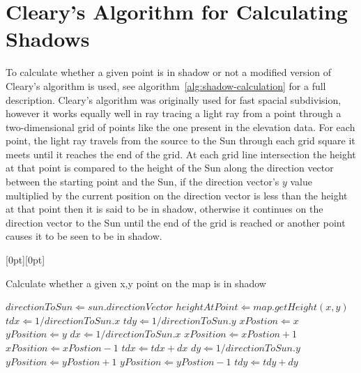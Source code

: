 \documentclass[12pt]{report}
\newcommand{\note}[1]{\raisebox{0pt}[0pt][0pt]{\pdfcomment[open=true]{#1}}}
\begin{document}
\section{Cleary's Algorithm for Calculating Shadows}
To calculate whether a given point is in shadow or not a modified version of Cleary's algorithm\cite{cleary} is used, see algorithm~\ref{alg:shadow-calculation} for a full description. Cleary's algorithm was originally used for fast spacial subdivision, however it works equally well in ray tracing a light ray from a point through a two-dimensional grid of points like the one present in the elevation data. For each point, the light ray travels from the source to the Sun through each grid square it meets until it reaches the end of the grid. At each grid line intersection the height at that point is compared to the height of the Sun along the direction vector between the starting point and the Sun, if the direction vector's $y$ value multiplied by the current position on the direction vector is less than the height at that point then it is said to be in shadow, otherwise it continues on the direction vector to the Sun until the end of the grid is reached or another point causes it to be seen to be in shadow.

\begin{algorithm}[h]
\note{I have no idea how to make this look better}
\caption{Calculate whether a given x,y point on the map is in shadow}
\label{alg:shadow-calculation}%
\begin{algorithmic}           %
\STATE $directionToSun \Leftarrow sun.directionVector$
\STATE $heightAtPoint \Leftarrow map.getHeight(x,y)$
\STATE $tdx \Leftarrow 1 / directionToSun.x$
\STATE $tdy \Leftarrow 1 / directionToSun.y$
\STATE $xPostion \Leftarrow x$
\STATE $yPosition \Leftarrow y$
	\ENDIF
		\STATE $dx \Leftarrow 1 / directionToSun.x$
			\STATE $xPosition \Leftarrow xPostion + 1$	
		\ELSE
			\STATE $xPosition \Leftarrow xPostion - 1$	
		\ENDIF
		\STATE $tdx \Leftarrow tdx + dx$
	\ELSE
		\STATE $dy \Leftarrow 1 / directionToSun.y$
			\STATE $yPosition \Leftarrow yPostion + 1$	
		\ELSE
			\STATE $yPosition \Leftarrow yPostion - 1$	
		\ENDIF
		\STATE $tdy \Leftarrow tdy + dy$		
	\ENDIF
\ENDWHILE
{}
\end{algorithmic}
\end{algorithm}
\end{document}
